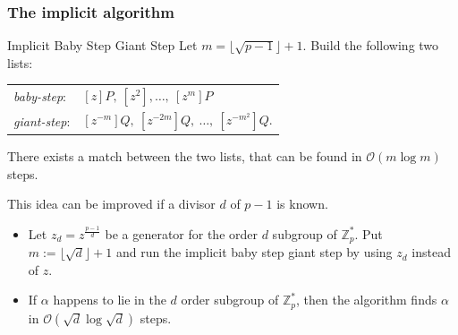 \documentclass[
	11pt, %
]{beamer}
\newcommand{\Z}{\mathbb{Z}}
\newcommand{\Zpstar}{\Z_p^*}
\theoremstyle{definition}
\theoremstyle{remark}
\begin{document}

\begin{frame}
\frametitle{The implicit algorithm}
\begin{block}{Implicit Baby Step Giant Step}
	Let $m=\lfloor\sqrt{p-1}\rfloor +1$. Build the following two lists:
	\begin{center}

	\begin{tabular}{ll} 
	\emph{baby-step}: & $[z]P,\ [z^{2}],\ldots,\ [z^m]P$ \\ 
	\emph{giant-step}: & $[z^{-m}]Q,\ [z^{-2m}]Q,\ \ldots,\ [z^{-m^2}]Q$.\\
\end{tabular}
\end{center}
There exists a match between the two lists, that can be found in $\mathcal{O}( m\log m)$ steps.
\end{block}
This idea can be improved if a divisor $d$ of $p-1$ is known. 
\begin{itemize}
	\item Let $z_d=z^{\frac{p-1}{d}}$  be a generator for the order $d$ subgroup of $\Zpstar$. Put $m:=\lfloor \sqrt{d}\rfloor+1$ and run the implicit baby step giant step by using $z_d$ instead of $z$. 
	\item If $\alpha$ happens to lie in the $d$ order subgroup of $\Zpstar$, then the algorithm finds $\alpha$ in $\mathcal{O}(\sqrt{d}\log\sqrt{d})$ steps. 
\end{itemize}
\end{frame}

\end{document}
